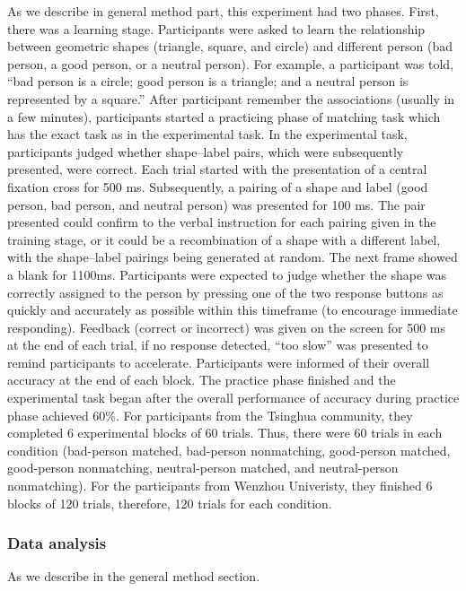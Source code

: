\documentclass[
  english,
  man]{apa6}
\begin{document}
As we describe in general method part, this experiment had two phases. First, there was a learning stage. Participants were asked to learn the relationship between geometric shapes (triangle, square, and circle) and different person (bad person, a good person, or a neutral person). For example, a participant was told, \enquote{bad person is a circle; good person is a triangle; and a neutral person is represented by a square.} After participant remember the associations (usually in a few minutes), participants started a practicing phase of matching task which has the exact task as in the experimental task.
In the experimental task, participants judged whether shape--label pairs, which were subsequently presented, were correct. Each trial started with the presentation of a central fixation cross for 500 ms. Subsequently, a pairing of a shape and label (good person, bad person, and neutral person) was presented for 100 ms. The pair presented could confirm to the verbal instruction for each pairing given in the training stage, or it could be a recombination of a shape with a different label, with the shape--label pairings being generated at random. The next frame showed a blank for 1100ms. Participants were expected to judge whether the shape was correctly assigned to the person by pressing one of the two response buttons as quickly and accurately as possible within this timeframe (to encourage immediate responding). Feedback (correct or incorrect) was given on the screen for 500 ms at the end of each trial, if no response detected, \enquote{too slow} was presented to remind participants to accelerate. Participants were informed of their overall accuracy at the end of each block. The practice phase finished and the experimental task began after the overall performance of accuracy during practice phase achieved 60\%.
For participants from the Tsinghua community, they completed 6 experimental blocks of 60 trials. Thus, there were 60 trials in each condition (bad-person matched, bad-person nonmatching, good-person matched, good-person nonmatching, neutral-person matched, and neutral-person nonmatching). For the participants from Wenzhou Univeristy, they finished 6 blocks of 120 trials, therefore, 120 trials for each condition.

\hypertarget{data-analysis}{%
\subsubsection{Data analysis}\label{data-analysis}}

As we describe in the general method section.
\end{document}
